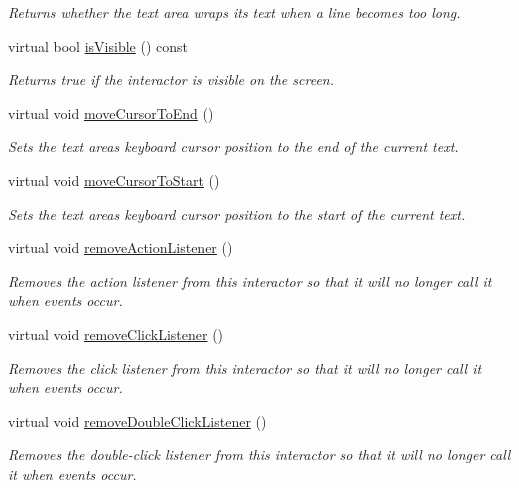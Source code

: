 \begin{DoxyCompactItemize}
\begin{DoxyCompactList}\small\item\em Returns whether the text area wraps its text when a line becomes too long. \end{DoxyCompactList}\item 
virtual bool \mbox{\hyperlink{classsgl_1_1GInteractor_a9d8a6cfb13917785c143e74d40e4e2be}{is\+Visible}} () const
\begin{DoxyCompactList}\small\item\em Returns true if the interactor is visible on the screen. \end{DoxyCompactList}\item 
virtual void \mbox{\hyperlink{classsgl_1_1GTextArea_ab5ef729cac166db0ef51ff7ea30d1bb8}{move\+Cursor\+To\+End}} ()
\begin{DoxyCompactList}\small\item\em Sets the text area\textquotesingle{}s keyboard cursor position to the end of the current text. \end{DoxyCompactList}\item 
virtual void \mbox{\hyperlink{classsgl_1_1GTextArea_a24abdceab57bcff96185afbadf193a22}{move\+Cursor\+To\+Start}} ()
\begin{DoxyCompactList}\small\item\em Sets the text area\textquotesingle{}s keyboard cursor position to the start of the current text. \end{DoxyCompactList}\item 
virtual void \mbox{\hyperlink{classsgl_1_1GInteractor_ab7fe7a876367b87cf7202f947f1d05e4}{remove\+Action\+Listener}} ()
\begin{DoxyCompactList}\small\item\em Removes the action listener from this interactor so that it will no longer call it when events occur. \end{DoxyCompactList}\item 
virtual void \mbox{\hyperlink{classsgl_1_1GInteractor_ad39d0325cde6b97ebda4b9d7787c633b}{remove\+Click\+Listener}} ()
\begin{DoxyCompactList}\small\item\em Removes the click listener from this interactor so that it will no longer call it when events occur. \end{DoxyCompactList}\item 
virtual void \mbox{\hyperlink{classsgl_1_1GInteractor_aa4250907e4cdd77349c04f0cf5cdd3d3}{remove\+Double\+Click\+Listener}} ()
\begin{DoxyCompactList}\small\item\em Removes the double-\/click listener from this interactor so that it will no longer call it when events occur. \end{DoxyCompactList}\item 

\end{DoxyCompactItemize}
